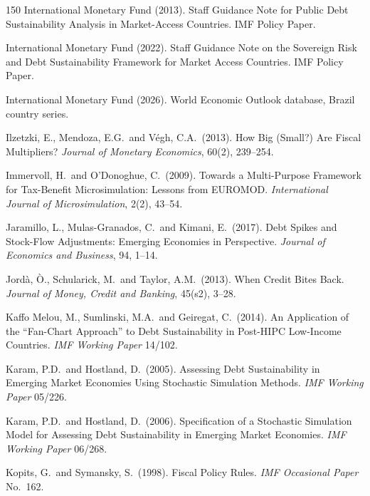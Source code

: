 \documentclass[11pt,a4paper]{article}
\begin{document}
\begin{thebibliography}{150}
 International Monetary Fund (2013). Staff Guidance Note for Public Debt Sustainability Analysis in Market-Access Countries. IMF Policy Paper.

 International Monetary Fund (2022). Staff Guidance Note on the Sovereign Risk and Debt Sustainability Framework for Market Access Countries. IMF Policy Paper.

 International Monetary Fund (2026). World Economic Outlook database, Brazil country series.

 Ilzetzki, E., Mendoza, E.G.\ and V\'egh, C.A.\ (2013). How Big (Small?) Are Fiscal Multipliers? \textit{Journal of Monetary Economics}, 60(2), 239--254.

 Immervoll, H.\ and O'Donoghue, C.\ (2009). Towards a Multi-Purpose Framework for Tax-Benefit Microsimulation: Lessons from EUROMOD. \textit{International Journal of Microsimulation}, 2(2), 43--54.

 Jaramillo, L., Mulas-Granados, C.\ and Kimani, E.\ (2017). Debt Spikes and Stock-Flow Adjustments: Emerging Economies in Perspective. \textit{Journal of Economics and Business}, 94, 1--14.

 Jord\`a, \`O., Schularick, M.\ and Taylor, A.M.\ (2013). When Credit Bites Back. \textit{Journal of Money, Credit and Banking}, 45(s2), 3--28.

 Kaffo Melou, M., Sumlinski, M.A.\ and Geiregat, C.\ (2014). An Application of the ``Fan-Chart Approach'' to Debt Sustainability in Post-HIPC Low-Income Countries. \textit{IMF Working Paper} 14/102.

 Karam, P.D.\ and Hostland, D.\ (2005). Assessing Debt Sustainability in Emerging Market Economies Using Stochastic Simulation Methods. \textit{IMF Working Paper} 05/226.

 Karam, P.D.\ and Hostland, D.\ (2006). Specification of a Stochastic Simulation Model for Assessing Debt Sustainability in Emerging Market Economies. \textit{IMF Working Paper} 06/268.

 Kopits, G.\ and Symansky, S.\ (1998). Fiscal Policy Rules. \textit{IMF Occasional Paper} No.\ 162.


\end{thebibliography}
\end{document}

